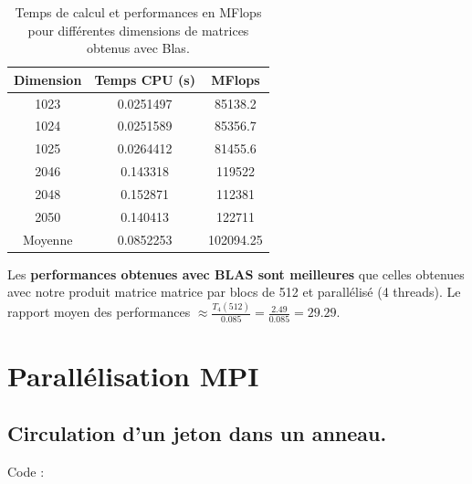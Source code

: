 \documentclass[a4paper,13pt]{book}
\begin{document}
\begin{table}[h!]
    \begin{center}
    \begin{tabular}{|c|c|c|}
        \hline
        Dimension & Temps CPU (s) & MFlops \\ \hline
        1023      & 0.0251497     & 85138.2 \\ \hline
        1024      & 0.0251589     & 85356.7 \\ \hline
        1025      & 0.0264412     & 81455.6 \\ \hline
        2046      & 0.143318      & 119522  \\ \hline
        2048      & 0.152871      & 112381  \\ \hline
        2050      & 0.140413      & 122711  \\ \hline
        Moyenne   & 0.0852253     & 102094.25 \\ \hline
    \end{tabular}
    \caption{Temps de calcul et performances en MFlops pour différentes dimensions de matrices obtenus avec Blas.}
    \label{tab:perf_matrix}
\end{center}
\end{table}
Les \textbf{performances obtenues avec BLAS sont meilleures} que celles obtenues avec notre produit matrice matrice par blocs de 512 et parallélisé (4 threads). Le rapport moyen des performances $\approx \frac{T_4(512)}{0.085} = \frac{2.49}{0.085} = 29.29$.

\section{Parallélisation MPI}
\subsection{Circulation d'un jeton dans un anneau.}


Code : \\
\end{document}
